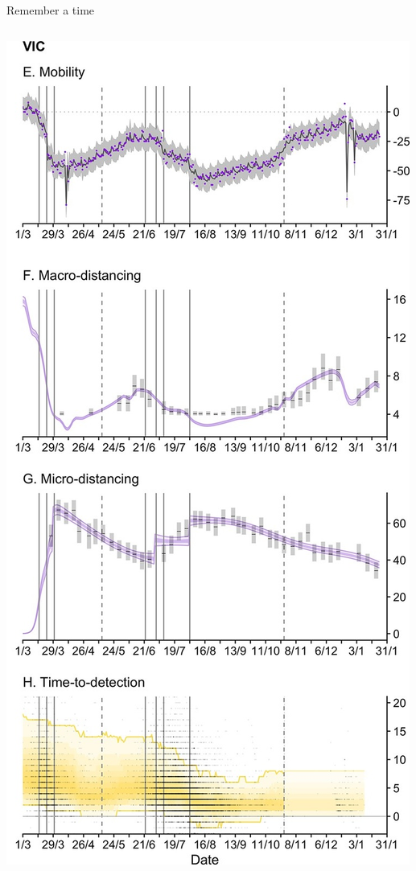 \documentclass[
  ignorenonframetext,
]{beamer}
\begin{document}
\begin{frame}{Remember a time}
\begin{columns}[T]
\begin{column}{0.3\textwidth}
\includegraphics{images/lax_78089_elife-78089-fig3-v2.tif.jpg}
\end{column}


\end{columns}
\end{frame}
\end{document}
